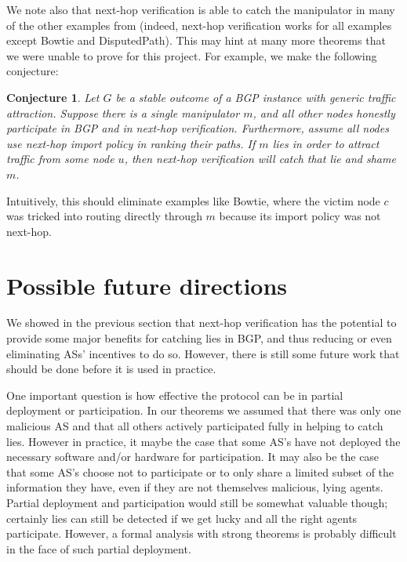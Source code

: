 \documentclass[pdftex,twoside,twocolumn,10pt,letterpaper]{article}
\newtheorem{conjecture}{Conjecture}
\begin{document}
  We note also that next-hop verification is able to catch the manipulator in
  many of the other examples from \cite{Attraction} (indeed, next-hop verification
  works for all examples except Bowtie and DisputedPath).
  This may hint at many more theorems that we were unable to prove for this
  project. For example, we make the following conjecture:
  \begin{conjecture}
    Let $G$ be a stable outcome of a BGP instance with generic traffic attraction.
    Suppose there is a single manipulator $m$,
    and all other nodes honestly participate in BGP and in next-hop verification.
    Furthermore, assume all nodes use next-hop import policy in ranking their paths.
    If $m$ lies in order to attract traffic from some node $u$,
    then next-hop verification will catch that lie and shame $m$.
  \end{conjecture}
  Intuitively, this should eliminate examples like Bowtie, where the victim node
  $c$ was tricked into routing directly through $m$ because its import policy was not
  next-hop.


\section{Possible future directions}

  We showed in the previous section that next-hop verification has the potential
  to provide some major benefits for catching lies in BGP, and thus reducing or
  even eliminating ASs' incentives to do so. However, there is still some future
  work that should be done before it is used in practice.

  One important question is how effective the protocol can be in partial
  deployment or participation. In our theorems we assumed that there was only
  one malicious AS and that all others actively participated fully in helping to
  catch lies. However in practice, it maybe the case that some AS's have not
  deployed the necessary software and/or hardware for participation. It may also
  be the case that some AS's choose not to participate or to only share a
  limited subset of the information they have, even if they are not themselves
  malicious, lying agents.
  Partial deployment and participation would still be somewhat valuable though;
  certainly lies can still be detected if we get lucky and all the right agents
  participate. However, a formal analysis with strong theorems is probably
  difficult in the face of such partial deployment.
\end{document}
